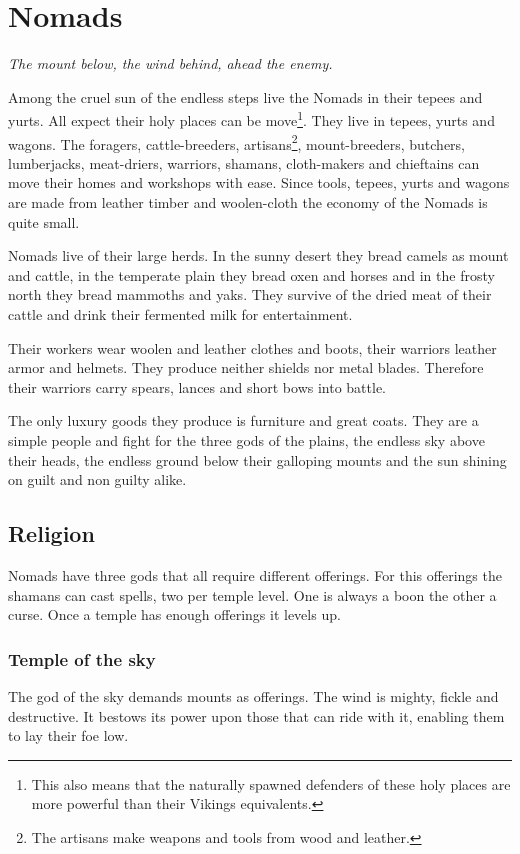 \section{\Gls{Nomads}}

\begin{flushright}
	\emph{The mount below, the wind behind, ahead the enemy.}
\end{flushright}

Among the cruel sun of the endless steps live the \gls{Nomads} in their tepees
and yurts. All expect their holy places can be move\footnote{ This also means
	that the naturally spawned defenders of these holy places are more powerful
	than their \gls{Vikings} equivalents. }. They live in tepees, yurts and wagons.
The foragers, cattle-breeders, artisans\footnote{ The artisans make weapons and
	tools from wood and leather. }, mount-breeders, butchers, lumberjacks,
meat-driers, warriors, shamans, cloth-makers and chieftains can move their
homes and workshops with ease. Since tools, tepees, yurts and wagons are made
from leather timber and woolen-cloth the economy of the \gls{Nomads} is quite
small.

\Gls{Nomads} live of their large herds. In the sunny desert they bread camels as mount
and cattle, in the temperate plain they bread oxen and horses and in the frosty north
they bread mammoths and yaks.
They survive of the dried meat of their cattle and drink their fermented milk for
entertainment.

Their workers wear woolen and leather clothes and boots, their warriors leather
armor and helmets. They produce neither shields nor metal blades. Therefore
their warriors carry spears, lances and short bows into battle.

The only luxury goods they produce is furniture and great coats. They are a
simple people and fight for the three gods of the plains, the endless sky above
their heads, the endless ground below their galloping mounts and the sun
shining on guilt and non guilty alike.

\subsection{Religion}
\Gls{Nomads} have three gods that all require different offerings.
For this offerings the shamans can cast spells, two per temple level.
One is always a boon the other a curse.
Once a temple has enough offerings it levels up.

\subsubsection{Temple of the sky}
The god of the sky demands mounts as offerings. The wind is mighty, fickle and
destructive. It bestows its power upon those that can ride with it, enabling
them to lay their foe low.


